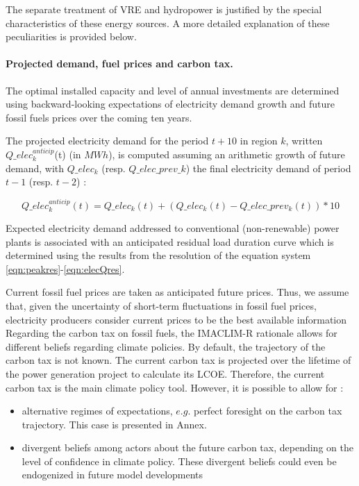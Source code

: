The separate treatment of VRE and hydropower is justified by the special characteristics of these energy sources. A more detailed explanation of these peculiarities is provided below.

\paragraph{Projected demand, fuel prices and carbon tax.}

The optimal installed capacity and level of annual investments are determined using backward-looking expectations of electricity demand growth and  future fossil fuels prices over the coming ten years.

The projected electricity demand for the period $t+10$ in region $k$, written $Q\_elec_k^{anticip}$(t) (in $MWh$), is computed assuming an arithmetic growth of future demand, with $Q\_elec_k$ (resp. $Q\_elec\_prev\_k$) the final electricity demand of period $t-1$ (resp. $t-2$)  : 

\begin{dmath}
    Q\_elec_k^{anticip}(t) = Q\_elec_k(t) + (Q\_elec_k(t) - Q\_elec\_prev_k(t))*10
    \label{eqn:elecQAnticip}
\end{dmath}

Expected electricity demand addressed to conventional (non-renewable) power plants is associated with an anticipated residual load duration curve which is determined using the results from the resolution of the equation system \ref{eqn:peakres}-\ref{eqn:elecQres}.

Current fossil fuel prices are taken as anticipated future prices. Thus, we assume that, given the uncertainty of short-term fluctuations in fossil fuel prices, electricity producers consider current prices to be the best available information 
Regarding the carbon tax on fossil fuels, the IMACLIM-R rationale allows for different beliefs regarding climate policies. By default, the trajectory of the carbon tax is not known. The current carbon tax is projected over the lifetime of the power generation project to calculate its LCOE. Therefore, the current carbon tax is the main climate policy tool. However, it is possible to allow for :
\begin{itemize}
    \item alternative regimes of expectations, $e.g.$ perfect foresight on the carbon tax trajectory. This case is presented in Annex.
    \item divergent beliefs among actors about the future carbon tax, depending on the level of confidence in climate policy. These divergent beliefs could even be endogenized in future model developments
\end{itemize} 

